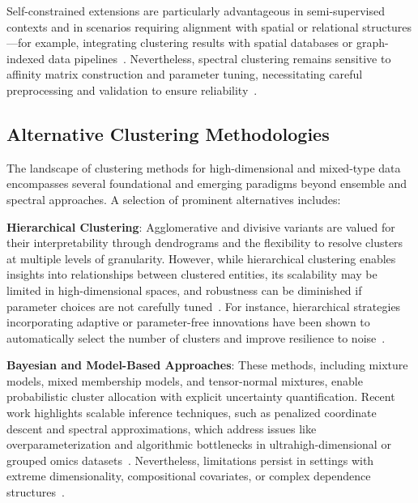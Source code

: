 \documentclass[sigconf]{acmart}
\begin{document}
Self-constrained extensions are particularly advantageous in semi-supervised contexts and in scenarios requiring alignment with spatial or relational structures—for example, integrating clustering results with spatial databases or graph-indexed data pipelines~\cite{ref117}. Nevertheless, spectral clustering remains sensitive to affinity matrix construction and parameter tuning, necessitating careful preprocessing and validation to ensure reliability~\cite{ref36,ref117}.

\subsection{Alternative Clustering Methodologies}

The landscape of clustering methods for high-dimensional and mixed-type data encompasses several foundational and emerging paradigms beyond ensemble and spectral approaches. A selection of prominent alternatives includes:

\textbf{Hierarchical Clustering}: Agglomerative and divisive variants are valued for their interpretability through dendrograms and the flexibility to resolve clusters at multiple levels of granularity. However, while hierarchical clustering enables insights into relationships between clustered entities, its scalability may be limited in high-dimensional spaces, and robustness can be diminished if parameter choices are not carefully tuned~\cite{ref4,ref16,ref22,ref36,ref50,ref61,ref62,ref63,ref64,ref65,ref69,ref71,ref90,ref92,ref97,ref100,ref116,ref117}. For instance, hierarchical strategies incorporating adaptive or parameter-free innovations have been shown to automatically select the number of clusters and improve resilience to noise~\cite{ref16,ref62}.

\textbf{Bayesian and Model-Based Approaches}: These methods, including mixture models, mixed membership models, and tensor-normal mixtures, enable probabilistic cluster allocation with explicit uncertainty quantification. Recent work highlights scalable inference techniques, such as penalized coordinate descent and spectral approximations, which address issues like overparameterization and algorithmic bottlenecks in ultrahigh-dimensional or grouped omics datasets~\cite{ref8,ref9,ref10,ref22,ref38,ref39,ref57,ref58,ref65,ref67,ref71,ref90,ref116,ref117,ref100}. Nevertheless, limitations persist in settings with extreme dimensionality, compositional covariates, or complex dependence structures~\cite{ref90,ref100}.
\end{document}
